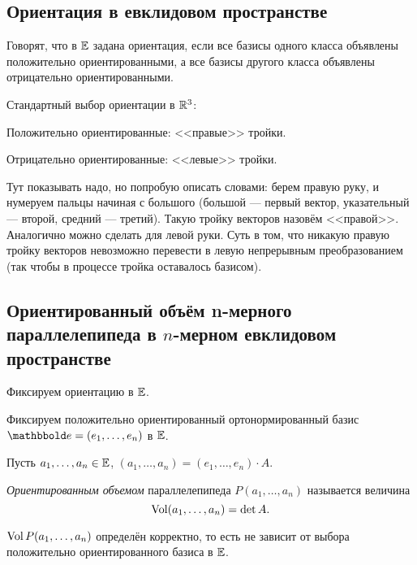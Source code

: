 \subsection{Ориентация в евклидовом пространстве}

\begin{definition}
    Говорят, что в $\mathbb{E}$ задана ориентация, если все базисы одного класса объявлены положительно ориентированными, а все базисы другого класса объявлены отрицательно ориентированными.
\end{definition}

\begin{example}
    Стандартный выбор ориентации в $\mathbb{R}^3$:

    Положительно ориентированные: <<правые>> тройки.

    Отрицательно ориентированные: <<левые>> тройки.

    \bigskip
    Тут показывать надо, но попробую описать словами: берем правую руку, и нумеруем пальцы начиная с большого (большой --- первый вектор, указательный --- второй, средний --- третий). Такую тройку векторов назовём <<правой>>. Аналогично можно сделать для левой руки. Суть в том, что никакую правую тройку векторов невозможно перевести в левую непрерывным преобразованием (так чтобы в процессе тройка оставалось базисом).
\end{example}


\subsection{Ориентированный объём n-мерного параллелепипеда в $n$-мерном евклидовом пространстве}

Фиксируем ориентацию в $\mathbb{E}$.

Фиксируем положительно ориентированный ортонормированный базис $\E = (e_1, \dots, e_n)$ в $\mathbb{E}$.

Пусть $a_1, \dots, a_n \in \mathbb{E}$, $(a_1, \dots, a_n) = (e_1, \dots, e_n) \cdot A$.

\begin{definition}
    \textit{Ориентированным объемом} параллелепипеда $P(a_1, \dots, a_n)$ называется величина
    \begin{equation*}
        \operatorname{\mathop{\mathrm{Vol}}} (a_1, \dots, a_n) = \det A
    .\end{equation*}
\end{definition}

\begin{proposal}
    $\operatorname{\mathop{\mathrm{Vol}}} P(a_1, \dots, a_n)$ определён корректно, то есть не зависит от выбора положительно ориентированного базиса в $\mathbb{E}$.
\end{proposal}

